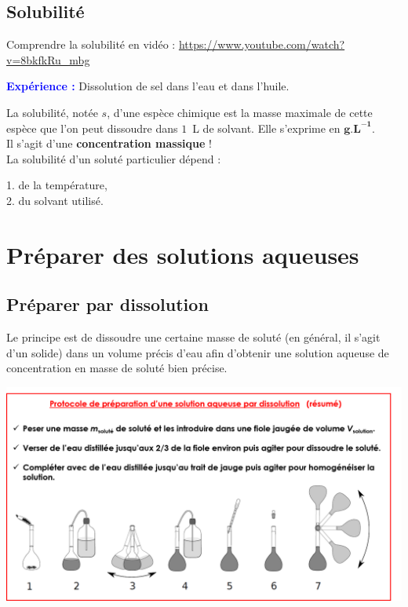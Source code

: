 \subsection{Solubilité}
Comprendre la solubilité en vidéo : \url{https://www.youtube.com/watch?v=8bkfkRu_mbg}\\
\begin{Large}
    \faFlask
\end{Large} \textcolor{blue}{\textbf{Expérience :}} Dissolution de sel dans l'eau et dans l'huile.
\begin{tcolorbox}[colback=green!5!white,colframe=green!75!black,title=\textbf{Définition}]
La solubilité, notée $s$, d'une espèce chimique est la masse maximale de cette espèce que l'on peut dissoudre dans $1$~L de solvant. Elle s'exprime en $\mathbf{g.L^{-1}}$.\\
Il s'agit d'une \textbf{concentration massique} !\\

La solubilité d'un soluté particulier dépend : 
\begin{center}
   1. de la température,\\
   2. du solvant utilisé.
\end{center}
\end{tcolorbox}

\section{Préparer des solutions aqueuses}

\subsection{Préparer par dissolution}
Le principe est de dissoudre une certaine masse de soluté (en général, il s'agit d'un solide) dans un volume précis d'eau afin d'obtenir une solution aqueuse de concentration en masse de soluté bien précise.
\begin{center}
    \includegraphics[scale=0.59]{Images/Dissolution.png}
\end{center}

